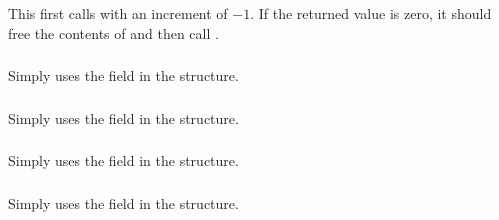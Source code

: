 \documentclass{article}
\begin{document}
\subsubsection{}

\subsubsection{}

\subsubsection{}

\subsubsection{}

\subsubsection{}
This first calls  with an increment of $-1$.  If
the returned value is zero, it should free the contents of  and
then call .

\subsubsection{}
Simply uses the  field in the structure.

\subsubsection{}
Simply uses the  field in the structure.

\subsubsection{}
Simply uses the  field in the structure.

\subsubsection{}
Simply uses the  field in the structure.
\end{document}
